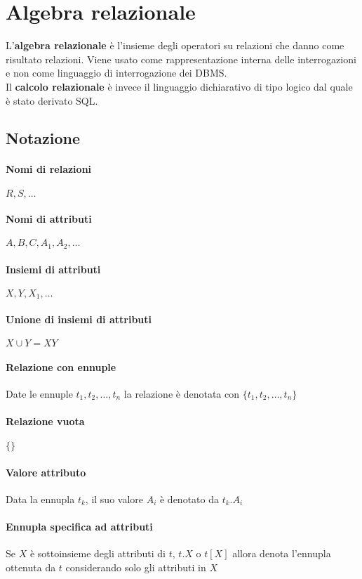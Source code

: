 \newpage
\section{Algebra relazionale}
L'\textbf{algebra relazionale} è l'insieme degli operatori su relazioni che danno come risultato relazioni. Viene usato come rappresentazione interna delle interrogazioni e non come linguaggio di interrogazione dei DBMS.\\
Il \textbf{calcolo relazionale} è invece il linguaggio dichiarativo di tipo logico dal quale è stato derivato SQL.

\subsection{Notazione}
\paragraph{Nomi di relazioni} $R, S, \ldots$
\paragraph{Nomi di attributi} $A, B, C, A_1, A_2, \ldots$
\paragraph{Insiemi di attributi} $X, Y, X_1, \ldots$
\paragraph{Unione di insiemi di attributi} $X \cup Y = XY$
\paragraph{Relazione con ennuple} Date le ennuple $t_1, t_2, \ldots, t_n$ la relazione è denotata con $\{t_1, t_2, \ldots, t_n\}$
\paragraph{Relazione vuota} $\{\}$
\paragraph{Valore attributo} Data la ennupla $t_k$, il suo valore $A_i$ è denotato da $t_k.A_i$
\paragraph{Ennupla specifica ad attributi} Se $X$ è sottoinsieme degli attributi di $t$, $t.X$ o $t[X]$ allora denota l’ennupla ottenuta da $t$ considerando solo gli attributi in $X$
